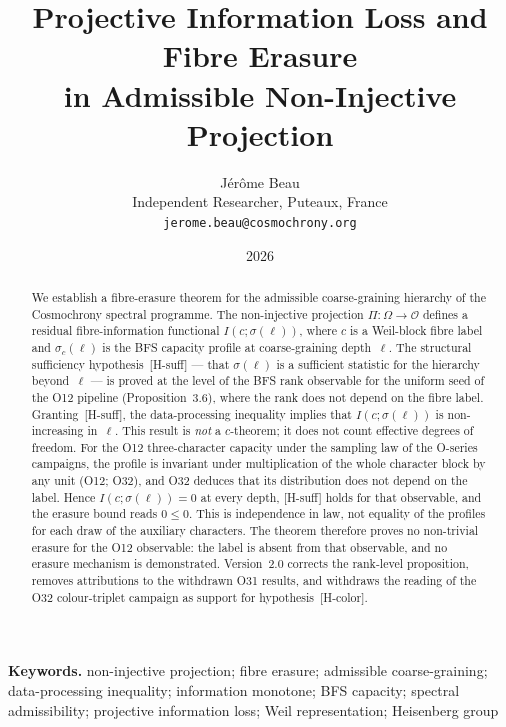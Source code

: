 \documentclass[11pt,a4paper]{article}
\title{Projective Information Loss and Fibre Erasure\\
in Admissible Non-Injective Projection}
\author{J\'er\^ome Beau\\[4pt]
\small Independent Researcher, Puteaux, France\\
\small \texttt{jerome.beau@cosmochrony.org}}
\date{2026}
\theoremstyle{plain}
\theoremstyle{definition}
\theoremstyle{remark}
\newcommand{\Omegaspace}{\Omega}
\newcommand{\Obs}{\mathcal{O}}
\begin{document}
  \maketitle

  \begin{abstract}
    We establish a fibre-erasure theorem for the admissible coarse-graining hierarchy
    of the Cosmochrony spectral programme.
    The non-injective projection $\Pi : \Omegaspace \to \Obs$ defines a residual
    fibre-information functional $I(c;\sigma(\ell))$,
    where $c$ is a Weil-block fibre label and $\sigma_c(\ell)$ is the BFS capacity
    profile at coarse-graining depth~$\ell$.
    The structural sufficiency hypothesis~\textup{[H-suff]} ---
    that $\sigma(\ell)$ is a sufficient statistic for the hierarchy beyond~$\ell$ ---
    is proved at the level of the BFS rank observable for the uniform seed of the O12 pipeline
    (Proposition~3.6), where the rank does not depend on the fibre label.
    Granting~\textup{[H-suff]}, the data-processing inequality
    implies that $I(c;\sigma(\ell))$ is non-increasing in~$\ell$.
    This result is \emph{not} a $c$-theorem; it does not count effective degrees of freedom.
    For the O12 three-character capacity under the sampling law of the O-series campaigns,
    the profile is invariant under multiplication of the whole character block by any
    unit (O12; O32), and O32 deduces that its distribution does not depend on
    the label.
    Hence $I(c;\sigma(\ell)) = 0$ at every depth, \textup{[H-suff]} holds for that observable,
    and the erasure bound reads $0 \leq 0$.
    This is independence in law, not equality of the profiles for each draw of the auxiliary
    characters.
    The theorem therefore proves no non-trivial erasure for the O12 observable: the label is
    absent from that observable, and no erasure mechanism is demonstrated.
    Version~2.0 corrects the rank-level proposition, removes attributions to the withdrawn O31
    results, and withdraws the reading of the O32 colour-triplet campaign as support for
    hypothesis~[H-color].
  \end{abstract}


  \smallskip
  \noindent\textbf{Keywords.}
  non-injective projection;
  fibre erasure;
  admissible coarse-graining;
  data-processing inequality;
  information monotone;
  BFS capacity;
  spectral admissibility;
  projective information loss;
  Weil representation;
  Heisenberg group

  \newpage
  \tableofcontents
\end{document}
